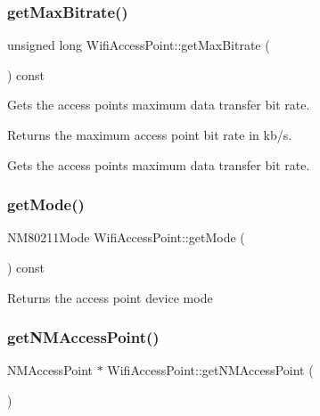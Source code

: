 \subsubsection{\texorpdfstring{get\+Max\+Bitrate()}{getMaxBitrate()}}
{\footnotesize\ttfamily unsigned long Wifi\+Access\+Point\+::get\+Max\+Bitrate (\begin{DoxyParamCaption}{ }\end{DoxyParamCaption}) const}

Gets the access point\textquotesingle{}s maximum data transfer bit rate.

\begin{DoxyReturn}{Returns}
the maximum access point bit rate in kb/s.
\end{DoxyReturn}
Gets the access point\textquotesingle{}s maximum data transfer bit rate. \mbox{\label{classWifiAccessPoint_a27bd3272631f8e9606457096825d7e02}} 
\subsubsection{\texorpdfstring{get\+Mode()}{getMode()}}
{\footnotesize\ttfamily N\+M80211\+Mode Wifi\+Access\+Point\+::get\+Mode (\begin{DoxyParamCaption}{ }\end{DoxyParamCaption}) const}

\begin{DoxyReturn}{Returns}
the access point device mode 
\end{DoxyReturn}
\mbox{\label{classWifiAccessPoint_a366e5ca1c7e95d108cb1903b90c78c33}} 
\subsubsection{\texorpdfstring{get\+N\+M\+Access\+Point()}{getNMAccessPoint()}}
{\footnotesize\ttfamily N\+M\+Access\+Point $\ast$ Wifi\+Access\+Point\+::get\+N\+M\+Access\+Point (\begin{DoxyParamCaption}{ }\end{DoxyParamCaption})}

